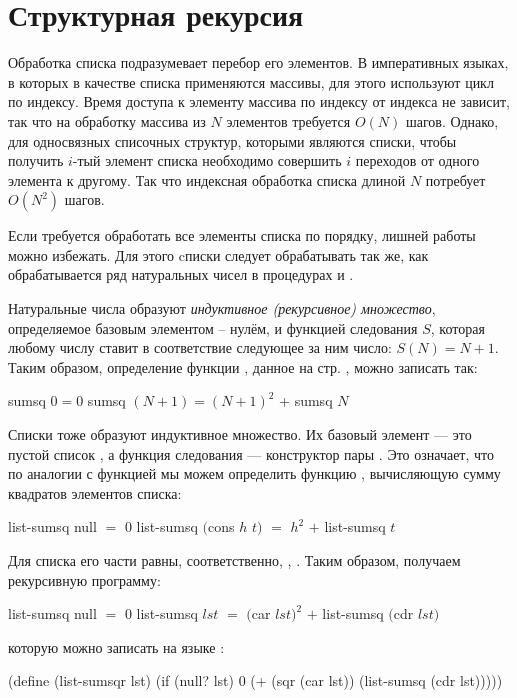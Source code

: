 \section{Структурная рекурсия}%
\label{struct-recursion}%
Обработка списка подразумевает перебор его элементов. В императивных языках, в которых в качестве списка применяются массивы, для этого используют цикл по индексу. Время доступа к элементу массива по индексу от индекса не зависит, так что на обработку массива из $N$ элементов требуется $O(N)$ шагов. 
Однако, для односвязных списочных структур, которыми являются списки, чтобы получить $i$-тый элемент списка необходимо совершить $i$ переходов от одного элемента к другому. Так что индексная обработка списка длиной $N$ потребует $O(N^2)$ шагов.

Если требуется обработать все элементы списка по порядку, лишней работы можно избежать. Для этого cписки следует обрабатывать так же, как обрабатывается ряд натуральных чисел в процедурах  и . 

Натуральные числа образуют \emph{индуктивное (рекурсивное) множество}, определяемое базовым элементом -- нулём, и функцией следования $S$, которая любому числу ставит в соответствие следующее за ним число: $S(N)=N+1$. 
Таким образом, определение функции , данное на стр. \pageref{sumsq}, можно записать так:

\begin{SchemeCode}
  sumsq $0 = 0$
  sumsq $(N + 1) = (N+1)^2$ + sumsq $N$
\end{SchemeCode}

Списки тоже образуют индуктивное множество. Их базовый элемент --- это пустой список , а функция следования --- конструктор пары . 
Это означает, что по аналогии с функцией  мы можем определить функцию , вычисляющую сумму квадратов элементов списка:

\begin{SchemeCode}
  list-sumsq null $=$ $0$
  list-sumsq $($cons $h$ $t)$ $=$ $h^2$ $+$ list-sumsq $t$
\end{SchemeCode}

Для списка  его части равны, соответственно, , . Таким образом, получаем рекурсивную программу:

\begin{SchemeCode}
  list-sumsq null $=$ $0$
  list-sumsq $lst$ $=$ $($car $lst)^2$ $+$ list-sumsq $($cdr $lst)$
\end{SchemeCode}
которую можно записать на языке \Scheme:
\begin{SchemeCode}[emph={lst}]
(define (list-sumsqr lst)
  (if (null? lst)
      0
      (+ (sqr (car lst)) (list-sumsq (cdr lst)))))
\end{SchemeCode}

